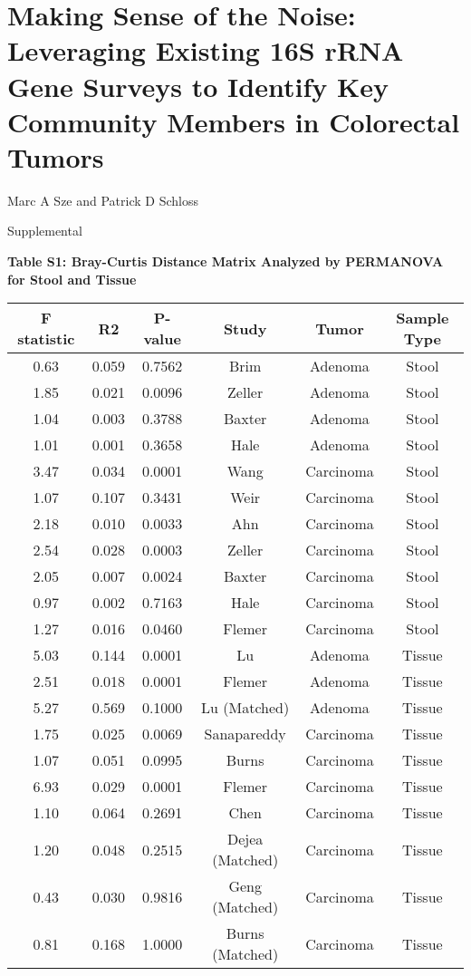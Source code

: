 \documentclass[12pt,]{article}
\title{}
\author{}
\date{}
\begin{document}
\section{Making Sense of the Noise: Leveraging Existing 16S rRNA Gene
Surveys to Identify Key Community Members in Colorectal
Tumors}\label{making-sense-of-the-noise-leveraging-existing-16s-rrna-gene-surveys-to-identify-key-community-members-in-colorectal-tumors}

\vspace{10mm}

\begin{center}
Marc A Sze and Patrick D Schloss

\vspace{10mm}

Supplemental
\end{center}

\newpage

\textbf{Table S1: Bray-Curtis Distance Matrix Analyzed by PERMANOVA for
Stool and Tissue}

\begin{longtable}[]{@{}cccccc@{}}
\toprule
F statistic & R2 & P-value & Study & Tumor & Sample Type\tabularnewline
\midrule
\endhead
0.63 & 0.059 & 0.7562 & Brim & Adenoma & Stool\tabularnewline
1.85 & 0.021 & 0.0096 & Zeller & Adenoma & Stool\tabularnewline
1.04 & 0.003 & 0.3788 & Baxter & Adenoma & Stool\tabularnewline
1.01 & 0.001 & 0.3658 & Hale & Adenoma & Stool\tabularnewline
3.47 & 0.034 & 0.0001 & Wang & Carcinoma & Stool\tabularnewline
1.07 & 0.107 & 0.3431 & Weir & Carcinoma & Stool\tabularnewline
2.18 & 0.010 & 0.0033 & Ahn & Carcinoma & Stool\tabularnewline
2.54 & 0.028 & 0.0003 & Zeller & Carcinoma & Stool\tabularnewline
2.05 & 0.007 & 0.0024 & Baxter & Carcinoma & Stool\tabularnewline
0.97 & 0.002 & 0.7163 & Hale & Carcinoma & Stool\tabularnewline
1.27 & 0.016 & 0.0460 & Flemer & Carcinoma & Stool\tabularnewline
5.03 & 0.144 & 0.0001 & Lu & Adenoma & Tissue\tabularnewline
2.51 & 0.018 & 0.0001 & Flemer & Adenoma & Tissue\tabularnewline
5.27 & 0.569 & 0.1000 & Lu (Matched) & Adenoma & Tissue\tabularnewline
1.75 & 0.025 & 0.0069 & Sanapareddy & Carcinoma & Tissue\tabularnewline
1.07 & 0.051 & 0.0995 & Burns & Carcinoma & Tissue\tabularnewline
6.93 & 0.029 & 0.0001 & Flemer & Carcinoma & Tissue\tabularnewline
1.10 & 0.064 & 0.2691 & Chen & Carcinoma & Tissue\tabularnewline
1.20 & 0.048 & 0.2515 & Dejea (Matched) & Carcinoma &
Tissue\tabularnewline
0.43 & 0.030 & 0.9816 & Geng (Matched) & Carcinoma &
Tissue\tabularnewline
0.81 & 0.168 & 1.0000 & Burns (Matched) & Carcinoma &
Tissue\tabularnewline
\bottomrule
\end{longtable}
\end{document}
